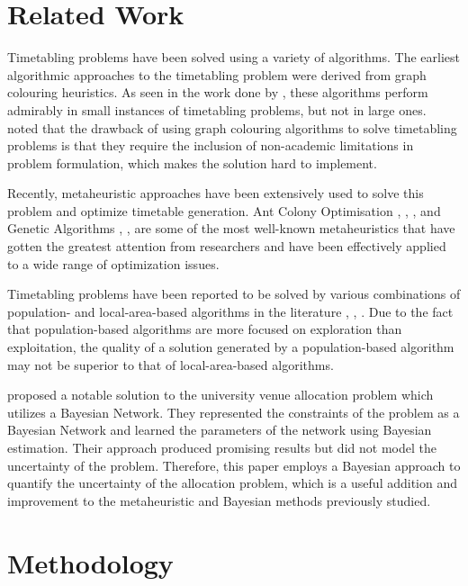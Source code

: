 \documentclass[conference]{IEEEtran}
\begin{document}
\section{Related Work}

Timetabling problems have been solved using a variety of algorithms. The earliest algorithmic approaches to the timetabling problem were derived from graph colouring heuristics. As seen in the work done by \cite{welsh1967upper}, these algorithms perform admirably in small instances of timetabling problems, but not in large ones. \cite{yu2002genetic} noted that the drawback of using graph colouring algorithms to solve timetabling problems is that they require the inclusion of non-academic limitations in problem formulation, which makes the solution hard to implement.

Recently, metaheuristic approaches have been extensively used to solve this problem and optimize timetable generation. Ant Colony Optimisation \cite{socha2002max}, \cite{cauvery2011timetable}, \cite{ceschia2012design}, \cite{nothegger2012solving} and Genetic Algorithms \cite{abdullah2007hybrid}, \cite{khonggamnerd2009improvement}, are some of the most well-known metaheuristics that have gotten the greatest attention from researchers and have been effectively applied to a wide range of optimization issues.

Timetabling problems have been reported to be solved by various combinations of population- and local-area-based algorithms in the literature \cite{tuga}, \cite{hao}, \cite{irene}. Due to the fact that population-based algorithms are more focused on exploration than exploitation, the quality of a solution generated by a population-based algorithm may not be superior to that of local-area-based algorithms.

\cite{bhagirathiautomatic} proposed a notable solution to the university venue allocation problem which utilizes a Bayesian Network. They represented the constraints of the problem as a Bayesian Network and learned the parameters of the network using Bayesian estimation. Their approach produced promising results but did not model the uncertainty of the problem. Therefore, this paper employs a Bayesian approach to quantify the uncertainty of the allocation problem, which is a useful addition and improvement to the metaheuristic and Bayesian methods previously studied. 

\section{Methodology}
\end{document}
